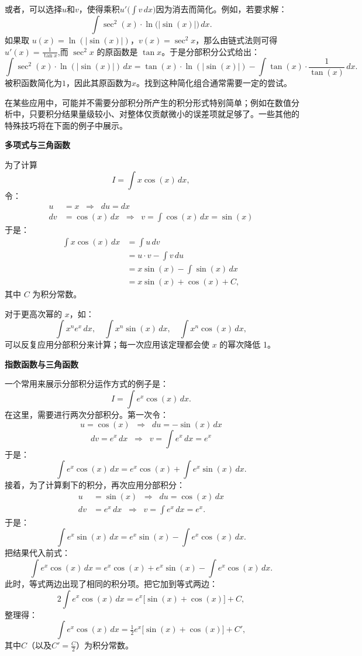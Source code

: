 或者，可以选择$u$和$v$，使得乘积$u' \bigl(\int v\,dx\bigr)$因为消去而简化。例如，若要求解：
$$
\int \sec^{2}(x)\cdot \ln\!\bigl(|\sin(x)|\bigr)\,dx.~
$$
如果取 $u(x) = \ln(|\sin(x)|)$，$v(x) = \sec^{2}x$，那么由链式法则可得$
u'(x) = \frac{1}{\tan x}$,而 $\sec^{2}x$ 的原函数是 $\tan x$。于是分部积分公式给出：
$$
\int \sec^{2}(x)\cdot \ln(|\sin(x)|)\,dx
= \tan(x)\cdot \ln(|\sin(x)|) - \int \tan(x)\cdot \frac{1}{\tan(x)}\,dx .~
$$
被积函数简化为$1$，因此其原函数为$x$。找到这种简化组合通常需要一定的尝试。

在某些应用中，可能并不需要分部积分所产生的积分形式特别简单；例如在数值分析中，只要积分结果量级较小、对整体仅贡献微小的误差项就足够了。一些其他的特殊技巧将在下面的例子中展示。

\textbf{多项式与三角函数}

为了计算
$$
I = \int x \cos(x)\,dx,~
$$
令：
$$
\begin{aligned}
u &= x \;\;\Rightarrow\;\; du = dx\\
dv &= \cos(x)\,dx \;\;\Rightarrow\;\; v = \int \cos(x)\,dx = \sin(x)
\end{aligned}~
$$
于是：
$$
\begin{aligned}
\int x\cos(x)\,dx &= \int u\,dv \\
&= u \cdot v - \int v\,du \\
&= x\sin(x) - \int \sin(x)\,dx \\
&= x\sin(x) + \cos(x) + C,
\end{aligned}~
$$
其中 $C$ 为积分常数。

对于更高次幂的 $x$，如：
$$
\int x^{n}e^{x}\,dx, \quad \int x^{n}\sin(x)\,dx, \quad \int x^{n}\cos(x)\,dx,~
$$
可以反复应用分部积分来计算；每一次应用该定理都会使 $x$ 的幂次降低 1。

\textbf{指数函数与三角函数}

一个常用来展示分部积分运作方式的例子是：
$$
I = \int e^{x}\cos(x)\,dx.~
$$
在这里，需要进行两次分部积分。第一次令：
$$
u = \cos(x) \;\;\Rightarrow\;\; du = -\sin(x)\,dx~
$$
$$
dv = e^{x}\,dx \;\;\Rightarrow\;\; v = \int e^{x}\,dx = e^{x}~
$$
于是：
$$
\int e^{x}\cos(x)\,dx = e^{x}\cos(x) + \int e^{x}\sin(x)\,dx.~
$$
接着，为了计算剩下的积分，再次应用分部积分：
$$
\begin{aligned}
u &= \sin(x) \;\;\Rightarrow\;\; du = \cos(x)\,dx\\
dv &= e^{x}\,dx \;\;\Rightarrow\;\; v = \int e^{x}\,dx = e^{x}.
\end{aligned}~
$$
于是：
$$
\int e^{x}\sin(x)\,dx = e^{x}\sin(x) - \int e^{x}\cos(x)\,dx.~
$$
把结果代入前式：
$$
\int e^{x}\cos(x)\,dx = e^{x}\cos(x) + e^{x}\sin(x) - \int e^{x}\cos(x)\,dx.~
$$
此时，等式两边出现了相同的积分项。把它加到等式两边：
$$
2\int e^{x}\cos(x)\,dx = e^{x}\bigl[\sin(x) + \cos(x)\bigr] + C,~
$$
整理得：
$$
\int e^{x}\cos(x)\,dx = \tfrac{1}{2}e^{x}\bigl[\sin(x) + \cos(x)\bigr] + C',~
$$
其中$C$（以及$C' = \tfrac{C}{2}$）为积分常数。

